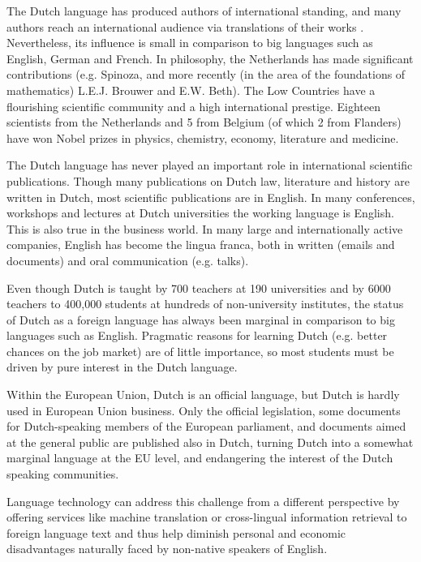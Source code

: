 \begin{multicols}{2}
    The Dutch language has produced authors of international standing, and many authors reach an international audience via translations of their works \cite{Vertalingendb}.   Nevertheless, its influence is small in comparison to big languages such as English, German and French. In philosophy, the Netherlands has made significant contributions (e.g. Spinoza, and more recently (in the area of the foundations of mathematics) L.E.J. Brouwer and E.W. Beth). The Low Countries have a flourishing scientific community and a high international prestige.  Eighteen scientists from the Netherlands and 5 from Belgium (of which 2 from Flanders) have won Nobel prizes in physics, chemistry, economy, literature and medicine.

    The Dutch language has never played an important role in international scientific publications. Though many publications on Dutch law, literature and history are written in Dutch, most scientific publications are in English. In many conferences, workshops and lectures at Dutch universities the working language is English. This is also true in the business world. In many large and internationally active companies, English has become the lingua franca, both in written (emails and documents) and oral communication (e.g. talks).


    Even though Dutch is taught by 700 teachers at 190 universities and by 6000 teachers to 400,000 students at hundreds of non-university institutes, the status of Dutch as a foreign language has always been marginal in comparison to big languages such as English. Pragmatic reasons for learning Dutch (e.g. better chances on the job market) are of little importance, so most students must be driven by pure interest in the Dutch language.

    Within the European Union, Dutch is an official language, but Dutch is hardly used in European Union business. Only the official legislation, some documents for Dutch-speaking members of the European parliament, and documents aimed at the general public are published also in Dutch, turning Dutch into a somewhat marginal language at the EU level, and endangering the interest of the Dutch speaking communities.

    Language technology can address this challenge from a different perspective by offering services like machine translation or cross-lingual information retrieval to foreign language text and thus help diminish personal and economic disadvantages naturally faced by non-native speakers of English.


\end{multicols}
